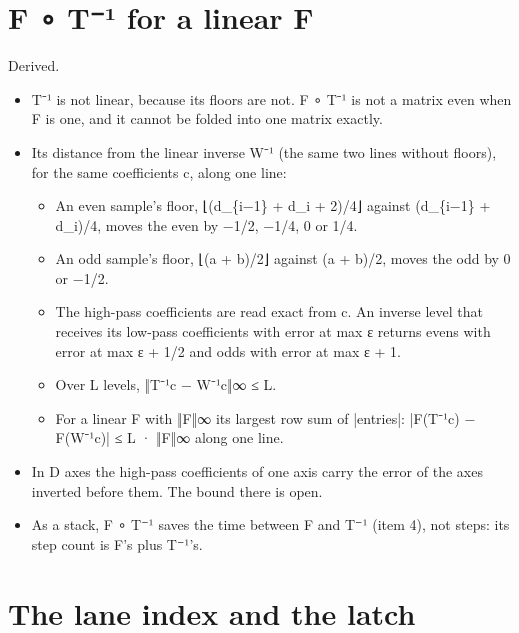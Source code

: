 \section{\texorpdfstring{F ∘ T⁻¹ for a linear F}{F ∘ T⁻¹ for a linear F}}

Derived.

\begin{itemize}
\item T⁻¹ is not linear, because its floors are not. F ∘ T⁻¹ is not a matrix even when F is one, and it cannot be folded into one matrix exactly.
\item Its distance from the linear inverse W⁻¹ (the same two lines without floors), for the same coefficients c, along one line:

\begin{itemize}
\item An even sample's floor, ⌊(d\_\allowbreak{}\{i−1\} + d\_\allowbreak{}i + 2)/4⌋ against (d\_\allowbreak{}\{i−1\} + d\_\allowbreak{}i)/4, moves the even by −1/2, −1/4, 0 or 1/4.
\item An odd sample's floor, ⌊(a + b)/2⌋ against (a + b)/2, moves the odd by 0 or −1/2.
\item The high-pass coefficients are read exact from c. An inverse level that receives its low-pass coefficients with error at max ε returns evens with error at max ε + 1/2 and odds with error at max ε + 1.
\item Over L levels, ‖T⁻¹c − W⁻¹c‖∞ ≤ L.
\item For a linear F with ‖F‖∞ its largest row sum of |entries|: |F(T⁻¹c) − F(W⁻¹c)| ≤ L · ‖F‖∞ along one line.
\end{itemize}
\item In D axes the high-pass coefficients of one axis carry the error of the axes inverted before them. The bound there is open.
\item As a stack, F ∘ T⁻¹ saves the time between F and T⁻¹ (item 4), not steps: its step count is F's plus T⁻¹'s.
\end{itemize}

\section{\texorpdfstring{The lane index and the latch}{The lane index and the latch}}

